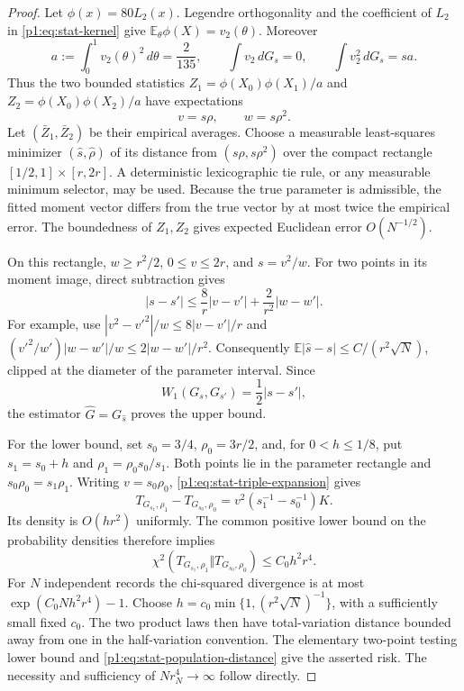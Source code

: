 \documentclass[11pt,a4paper]{article}
\theoremstyle{definition}
\theoremstyle{remark}
\numberwithin{equation}{section}
\begin{document}
\begin{proof}
Let $\phi(x)=80L_2(x)$.  Legendre orthogonality and the coefficient of $L_2$
in \eqref{p1:eq:stat-kernel} give
$\mathbb E_\theta\phi(X)=v_2(\theta)$.  Moreover
\[
 a:=\int_0^1v_2(\theta)^2\,d\theta=\frac2{135},\qquad
 \int v_2\,dG_s=0,\qquad\int v_2^2\,dG_s=sa.
\]
Thus the two bounded statistics $Z_1=\phi(X_0)\phi(X_1)/a$ and
$Z_2=\phi(X_0)\phi(X_2)/a$ have expectations
\begin{equation}\label{p1:eq:stat-two-moments}
                      v=s\rho,\qquad w=s\rho^2.
\end{equation}
Let $(\bar Z_1,\bar Z_2)$ be their empirical averages.  Choose a measurable
least-squares minimizer $(\widehat s,\widehat\rho)$ of its distance from
$(s\rho,s\rho^2)$ over the compact rectangle $[1/2,1]\times[r,2r]$.
A deterministic lexicographic tie rule, or any measurable minimum selector,
may be used.  Because the true parameter is admissible, the fitted moment
vector differs from the true vector by at most twice the empirical error.
The boundedness of $Z_1,Z_2$ gives expected Euclidean error $O(N^{-1/2})$.

On this rectangle, $w\ge r^2/2$, $0\le v\le2r$, and $s=v^2/w$.  For two
points in its moment image, direct subtraction gives
\[
 |s-s'|\le\frac{8}{r}|v-v'|+\frac{2}{r^2}|w-w'|.
\]
For example, use
$|v^2-v'^2|/w\le8|v-v'|/r$ and
$(v'^2/w')|w-w'|/w\le2|w-w'|/r^2$.
Consequently $\mathbb E|\widehat s-s|\le C/(r^2\sqrt N)$, clipped at the
diameter of the parameter interval.  Since
\begin{equation}\label{p1:eq:stat-population-distance}
                   W_1(G_s,G_{s'})=\frac12|s-s'|,
\end{equation}
the estimator $\widehat G=G_{\widehat s}$ proves the upper bound.

For the lower bound, set $s_0=3/4$, $\rho_0=3r/2$, and, for
$0<h\le1/8$, put $s_1=s_0+h$ and $\rho_1=\rho_0s_0/s_1$.
Both points lie in the parameter rectangle and $s_0\rho_0=s_1\rho_1$.
Writing $v=s_0\rho_0$, \eqref{p1:eq:stat-triple-expansion} gives
\[
 T_{G_{s_1},\rho_1}-T_{G_{s_0},\rho_0}
       =v^2(s_1^{-1}-s_0^{-1})K.
\]
Its density is $O(hr^2)$ uniformly.  The common positive lower bound on
the probability densities therefore implies
\[
 \chi^2(T_{G_{s_1},\rho_1}\Vert T_{G_{s_0},\rho_0})\le C_0h^2r^4.
\]
For $N$ independent records the chi-squared divergence is at most
$\exp(C_0Nh^2r^4)-1$.  Choose
$h=c_0\min\{1,(r^2\sqrt N)^{-1}\}$, with a sufficiently small fixed $c_0$.
The two product laws then have total-variation distance bounded away from
one in the half-variation convention.  The elementary two-point testing
lower bound and \eqref{p1:eq:stat-population-distance} give the asserted risk.
The necessity and sufficiency of $Nr_N^4\to\infty$ follow directly.
\end{proof}
\end{document}
